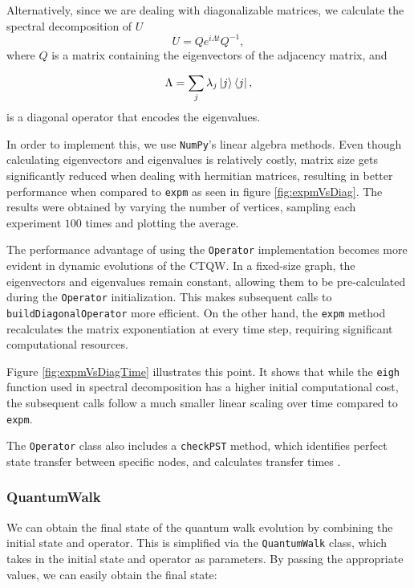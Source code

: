 \documentclass[main.tex]{subfiles}
\begin{document}
Alternatively, since we are dealing with diagonalizable matrices, we calculate
the spectral decomposition of $U$
\begin{equation}
    U = Q e^{i\Lambda t} Q^{-1} ,
\end{equation}
where $Q$ is a matrix containing the eigenvectors of the adjacency matrix, and 

\begin{equation}
    \Lambda = \sum_{j} \lambda_j \ket{j}\bra{j},
\end{equation}
is a diagonal operator that encodes the eigenvalues. 

In order to implement this, we use \texttt{NumPy}'s linear algebra methods.
Even though calculating eigenvectors and eigenvalues is relatively costly,
matrix size gets significantly reduced when dealing with hermitian matrices,
resulting in better performance when compared to \texttt{expm} as seen in
figure \ref{fig:expmVsDiag}. The results were obtained by varying the number of
vertices, sampling each experiment $100$ times and plotting the average.\par

The performance advantage of using the \texttt{Operator} implementation becomes
more evident in dynamic evolutions of the CTQW. In a fixed-size graph, the
eigenvectors and eigenvalues remain constant, allowing them to be
pre-calculated during the \texttt{Operator} initialization. This makes
subsequent calls to \texttt{buildDiagonalOperator} more efficient. On the
other hand, the \texttt{expm} method recalculates the matrix exponentiation at
every time step, requiring significant computational resources.\par

Figure \ref{fig:expmVsDiagTime} illustrates this point. It shows that while the
\texttt{eigh} function used in spectral decomposition has a higher initial
computational cost, the subsequent calls follow a much smaller linear
scaling over time compared to \texttt{expm}.\par 

The \texttt{Operator} class also includes a \texttt{checkPST} method, which
identifies perfect state transfer between specific nodes, and calculates
transfer times \cite{coutinho17}.

\subsubsection{QuantumWalk}
We can obtain the final state of the quantum walk evolution by combining the
initial state and operator. This is simplified via the
\texttt{QuantumWalk} class, which takes in the initial state and operator as
parameters. By passing the appropriate values, we can easily obtain the
final state:
\end{document}
